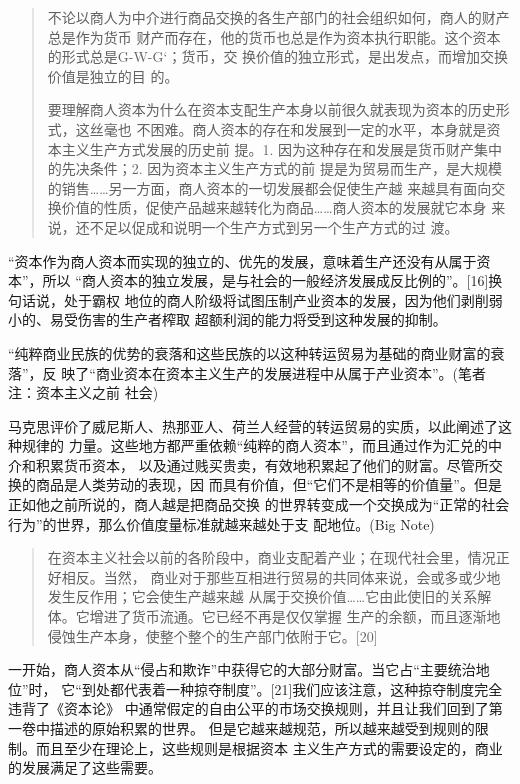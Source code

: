 \begin{quotation}
  不论以商人为中介进行商品交换的各生产部门的社会组织如何，商人的财产总是作为货币
  财产而存在，他的货币也总是作为资本执行职能。这个资本的形式总是G-W-G`；货币，交
  换价值的独立形式，是出发点，而增加交换价值是独立的目
  的。

  要理解商人资本为什么在资本支配生产本身以前很久就表现为资本的历史形式，这丝毫也
  不困难。商人资本的存在和发展到一定的水平，本身就是资本主义生产方式发展的历史前
  提。1. 因为这种存在和发展是货币财产集中的先决条件；2. 因为资本主义生产方式的前
  提是为贸易而生产，是大规模的销售……另一方面，商人资本的一切发展都会促使生产越
  来越具有面向交换价值的性质，促使产品越来越转化为商品……商人资本的发展就它本身
  来说，还不足以促成和说明一个生产方式到另一个生产方式的过
  渡。
\end{quotation}

“资本作为商人资本而实现的独立的、优先的发展，意味着生产还没有从属于资本”，所以
“商人资本的独立发展，是与社会的一般经济发展成反比例的”。[16]换句话说，处于霸权
地位的商人阶级将试图压制产业资本的发展，因为他们剥削弱小的、易受伤害的生产者榨取
超额利润的能力将受到这种发展的抑制。

“纯粹商业民族的优势的衰落和这些民族的以这种转运贸易为基础的商业财富的衰落”，反
映了“商业资本在资本主义生产的发展进程中从属于产业资本”。(笔者注：资本主义之前
社会)

马克思评价了威尼斯人、热那亚人、荷兰人经营的转运贸易的实质，以此阐述了这种规律的
力量。这些地方都严重依赖“纯粹的商人资本”，而且通过作为汇兑的中介和积累货币资本，
以及通过贱买贵卖，有效地积累起了他们的财富。尽管所交换的商品是人类劳动的表现，因
而具有价值，但“它们不是相等的价值量”。但是正如他之前所说的，商人越是把商品交换
的世界转变成一个交换成为“正常的社会行为”的世界，那么价值度量标准就越来越处于支
配地位。(Big Note)

\begin{quotation}
  在资本主义社会以前的各阶段中，商业支配着产业；在现代社会里，情况正好相反。当然，
  商业对于那些互相进行贸易的共同体来说，会或多或少地发生反作用；它会使生产越来越
  从属于交换价值……它由此使旧的关系解体。它增进了货币流通。它已经不再是仅仅掌握
  生产的余额，而且逐渐地侵蚀生产本身，使整个整个的生产部门依附于它。[20]
\end{quotation}

一开始，商人资本从“侵占和欺诈”中获得它的大部分财富。当它占“主要统治地位”时，
它“到处都代表着一种掠夺制度”。[21]我们应该注意，这种掠夺制度完全违背了《资本论》
中通常假定的自由公平的市场交换规则，并且让我们回到了第一卷中描述的原始积累的世界。
但是它越来越规范，所以越来越受到规则的限制。而且至少在理论上，这些规则是根据资本
主义生产方式的需要设定的，商业的发展满足了这些需要。

